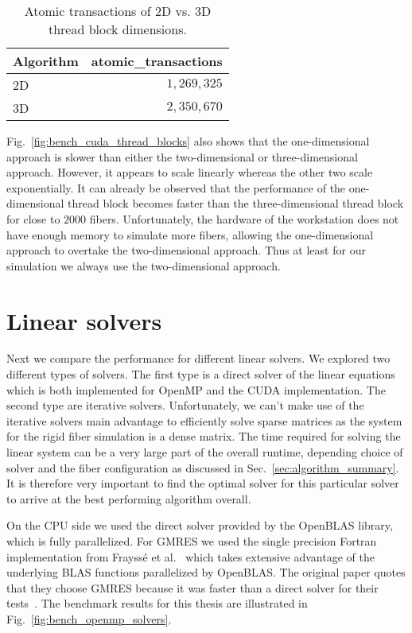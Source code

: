 \begin{table}[!htbp]
  \begin{center}
    \begin{tabulary}{0.7\textwidth}{LR}
      \toprule
      Algorithm & atomic\_transactions \\
      \midrule
      2D & $1,269,325$ \\
      3D & $2,350,670$ \\
      \bottomrule
    \end{tabulary}
  \end{center}
  \caption{Atomic transactions of 2D vs. 3D thread block dimensions.}
  \label{tab:atomic_transactions}
\end{table}

Fig.~\ref{fig:bench_cuda_thread_blocks} also shows that the one-dimensional approach is slower than either the two-dimensional or three-dimensional approach. However, it appears to scale linearly whereas the other two scale exponentially. It can already be observed that the performance of the one-dimensional thread block becomes faster than the three-dimensional thread block for close to $2000$ fibers. Unfortunately, the hardware of the workstation does not have enough memory to simulate more fibers, allowing the one-dimensional approach to overtake the two-dimensional approach. Thus at least for our simulation we always use the two-dimensional approach.

\section{Linear solvers}
\label{sec:bench_linear_solvers}

Next we compare the performance for different linear solvers. We explored two different types of solvers. The first type is a direct solver of the linear equations which is both implemented for OpenMP and the CUDA implementation. The second type are iterative solvers. Unfortunately, we can't make use of the iterative solvers main advantage to efficiently solve sparse matrices as the system for the rigid fiber simulation is a dense matrix. The time required for solving the linear system can be a very large part of the overall runtime, depending choice of solver and the fiber configuration as discussed in Sec.~\ref{sec:algorithm_summary}. It is therefore very important to find the optimal solver for this particular solver to arrive at the best performing algorithm overall.

On the CPU side we used the direct solver provided by the OpenBLAS library, which is fully parallelized. For GMRES we used the single precision Fortran implementation from Frayssé et al.~\cite{Fraysse2003} which takes extensive advantage of the underlying BLAS functions parallelized by OpenBLAS. The original paper quotes that they choose GMRES because it was faster than a direct solver for their tests~\cite{Tornberg2006}. The benchmark results for this thesis are illustrated in Fig.~\ref{fig:bench_openmp_solvers}.


